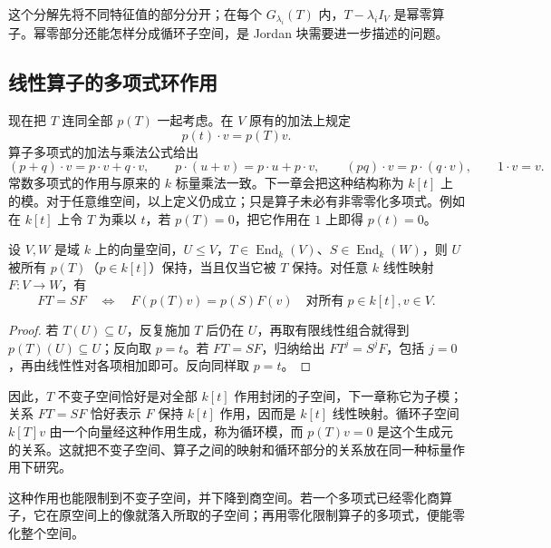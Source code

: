 这个分解先将不同特征值的部分分开；在每个 \(G_{\lambda_i}(T)\) 内，\(T-\lambda_iI_V\) 是幂零算子。幂零部分还能怎样分成循环子空间，是 Jordan 块需要进一步描述的问题。

\subsection{线性算子的多项式环作用}
\label{b2:subsec:0103:03}

现在把 \(T\) 连同全部 \(p(T)\) 一起考虑。在 \(V\) 原有的加法上规定
\[
	p(t)\cdot v=p(T)v.
\]
算子多项式的加法与乘法公式给出
\[
	(p+q)\cdot v=p\cdot v+q\cdot v,\qquad p\cdot(u+v)=p\cdot u+p\cdot v,\qquad (pq)\cdot v=p\cdot(q\cdot v),\qquad 1\cdot v=v.
\]
常数多项式的作用与原来的 \(k\) 标量乘法一致。下一章会把这种结构称为 \(k[t]\) 上的模。对于任意维空间，以上定义仍成立；只是算子未必有非零零化多项式。例如在 \(k[t]\) 上令 \(T\) 为乘以 \(t\)，若 \(p(T)=0\)，把它作用在 \(1\) 上即得 \(p(t)=0\)。

\begin{proposition}\label{b2:prop:polynomial-action-subspace}
	设 \(V,W\) 是域 \(k\) 上的向量空间，\(U\le V\)，\(T\in\operatorname{End}_k(V)\)、\(S\in\operatorname{End}_k(W)\)，则 \(U\) 被所有 \(p(T)\)（\(p\in k[t]\)）保持，当且仅当它被 \(T\) 保持。对任意 \(k\) 线性映射 \(F:V\to W\)，有
	\[
		FT=SF \quad\Longleftrightarrow\quad F(p(T)v)=p(S)F(v)\quad\text{对所有}\;p\in k[t],v\in V.
	\]
\end{proposition}
\begin{proof}
	若 \(T(U)\subseteq U\)，反复施加 \(T\) 后仍在 \(U\)，再取有限线性组合就得到 \(p(T)(U)\subseteq U\)；反向取 \(p=t\)。若 \(FT=SF\)，归纳给出 \(FT^j=S^jF\)，包括 \(j=0\)，再由线性性对各项相加即可。反向同样取 \(p=t\)。
\end{proof}

因此，\(T\) 不变子空间恰好是对全部 \(k[t]\) 作用封闭的子空间，下一章称它为子模；关系 \(FT=SF\) 恰好表示 \(F\) 保持 \(k[t]\) 作用，因而是 \(k[t]\) 线性映射。循环子空间 \(k[T]v\) 由一个向量经这种作用生成，称为循环模，而 \(p(T)v=0\) 是这个生成元的关系。这就把不变子空间、算子之间的映射和循环部分的关系放在同一种标量作用下研究。

\ProseParagraphBreak
这种作用也能限制到不变子空间，并下降到商空间。若一个多项式已经零化商算子，它在原空间上的像就落入所取的子空间；再用零化限制算子的多项式，便能零化整个空间。

